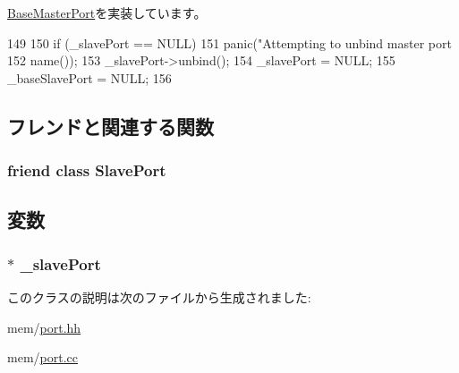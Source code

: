 \hyperlink{classBaseMasterPort_a406c5430a4a46c0068050632b9d3e765}{BaseMasterPort}を実装しています。


\begin{DoxyCode}
149 {
150     if (_slavePort == NULL)
151         panic("Attempting to unbind master port %
152               name());
153     _slavePort->unbind();
154     _slavePort = NULL;
155     _baseSlavePort = NULL;
156 }
\end{DoxyCode}


\subsection{フレンドと関連する関数}
\hypertarget{classMasterPort_a5344d902f61e69b03cd4d737c6375ce3}{
\subsubsection[{SlavePort}]{\setlength{\rightskip}{0pt plus 5cm}friend class {\bf SlavePort}}}
\label{classMasterPort_a5344d902f61e69b03cd4d737c6375ce3}


\subsection{変数}
\hypertarget{classMasterPort_a33e3b01a66e2118c0e01887bd905e904}{
\subsubsection[{\_\-slavePort}]{$\ast$ {\bf \_\-slavePort}}}
\label{classMasterPort_a33e3b01a66e2118c0e01887bd905e904}


このクラスの説明は次のファイルから生成されました:\begin{DoxyCompactItemize}
\item 
mem/\hyperlink{port_8hh}{port.hh}\item 
mem/\hyperlink{port_8cc}{port.cc}\end{DoxyCompactItemize}
